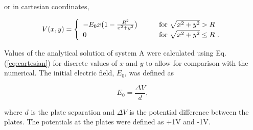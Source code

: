 \documentclass[a4paper]{jpconf}
\begin{document}
\noindent or in cartesian coordinates, 

\begin{equation}
V(x,y) = \left\{ 
  \begin{array}{l l}
   -E_0 x \big(1 - \frac{R^2}{x^2 + y^2}\big) & \qquad \text{for $\sqrt{x^2 + y^2} > R$}\\
    0 & \qquad \text{for $\sqrt{x^2 + y^2} \le R$~.}
  \end{array} \right.
  \label{eq:cartesian}
\end{equation}

%

Values of the analytical solution of system A were calculated using Eq.(\ref{eq:cartesian}) for discrete values of $x$ and $y$ to allow for comparison with the numerical. The initial electric field, $E_0$, was defined as

\begin{equation}
	E_0 = \frac{\Delta V}{d},
\end{equation} 

\noindent where $d$ is the plate separation and $\Delta V$ is the potential difference between the plates. The potentials at the plates were defined as +1V and -1V. \\

%
\end{document}
